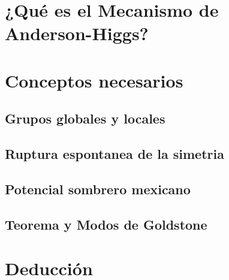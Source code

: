 \section{¿Qué es el Mecanismo de Anderson-Higgs?}

\section{Conceptos necesarios}

\subsection{Grupos globales y locales}

\subsection{Ruptura espontanea de la simetria}

\subsection{Potencial sombrero mexicano}

\subsection{Teorema y Modos de Goldstone}

\section{Deducción}
